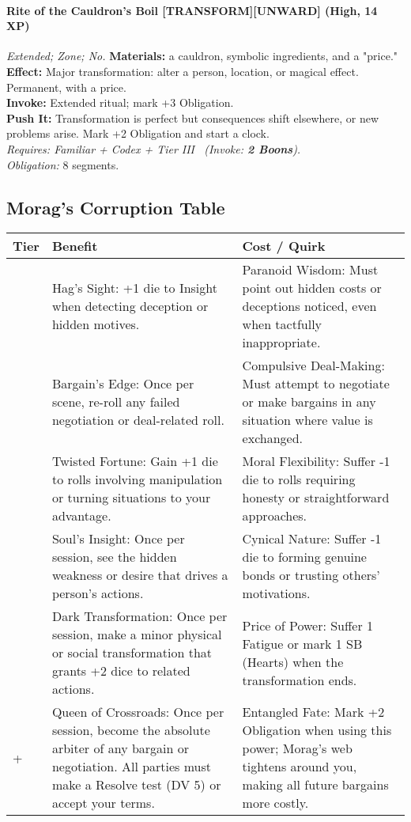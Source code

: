 \paragraph{Rite of the Cauldron's Boil \textnormal{[TRANSFORM][UNWARD]} (High, 14 XP)} \emph{Extended; Zone; No.}
\textbf{Materials:} a cauldron, symbolic ingredients, and a "price."\\
\textbf{Effect:} Major transformation: alter a person, location, or magical effect. Permanent, with a price.\\
\textbf{Invoke:} Extended ritual; mark +3 Obligation.\\
\textbf{Push It:} Transformation is perfect but consequences shift elsewhere, or new problems arise. Mark +2 Obligation and start a clock.\\
\emph{Requires: Familiar + Codex + Tier III \ (\textit{Invoke:} \textbf{2 Boons}).}\\
\emph{Obligation:} 8 segments.

\subsection*{Morag's Corruption Table}
\label{sec:morag-corruption}

\begin{longtable}{>{\raggedright\arraybackslash}p{1cm} p{5cm} p{5cm}}
\toprule
\textbf{Tier} & \textbf{Benefit} & \textbf{Cost / Quirk} \\
\midrule
1 & Hag's Sight: +1 die to Insight when detecting deception or hidden motives. & Paranoid Wisdom: Must point out hidden costs or deceptions noticed, even when tactfully inappropriate. \\
\midrule
2 & Bargain's Edge: Once per scene, re-roll any failed negotiation or deal-related roll. & Compulsive Deal-Making: Must attempt to negotiate or make bargains in any situation where value is exchanged. \\
\midrule
3 & Twisted Fortune: Gain +1 die to rolls involving manipulation or turning situations to your advantage. & Moral Flexibility: Suffer -1 die to rolls requiring honesty or straightforward approaches. \\
\midrule
4 & Soul's Insight: Once per session, see the hidden weakness or desire that drives a person's actions. & Cynical Nature: Suffer -1 die to forming genuine bonds or trusting others' motivations. \\
\midrule
5 & Dark Transformation: Once per session, make a minor physical or social transformation that grants +2 dice to related actions. & Price of Power: Suffer 1 Fatigue or mark 1 SB (Hearts) when the transformation ends. \\
\midrule
6+ & Queen of Crossroads: Once per session, become the absolute arbiter of any bargain or negotiation. All parties must make a Resolve test (DV 5) or accept your terms. & Entangled Fate: Mark +2 Obligation when using this power; Morag's web tightens around you, making all future bargains more costly. \\
\bottomrule
\end{longtable}